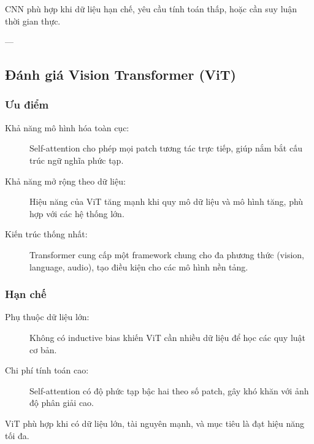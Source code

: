 \begin{mdframed}[style=infobox]
	CNN phù hợp khi dữ liệu hạn chế, yêu cầu tính toán thấp, hoặc cần suy luận thời gian thực.
\end{mdframed}

---

\subsection{Đánh giá Vision Transformer (ViT)}
\label{subsec:vit_evaluation}

\subsubsection{Ưu điểm}

\begin{description}
	\item[Khả năng mô hình hóa toàn cục:]  
	Self-attention cho phép mọi patch tương tác trực tiếp, giúp nắm bắt cấu trúc ngữ nghĩa phức tạp.
	
	\item[Khả năng mở rộng theo dữ liệu:]  
	Hiệu năng của ViT tăng mạnh khi quy mô dữ liệu và mô hình tăng, phù hợp với các hệ thống lớn.
	
	\item[Kiến trúc thống nhất:]  
	Transformer cung cấp một framework chung cho đa phương thức (vision, language, audio), tạo điều kiện cho các mô hình nền tảng.
\end{description}

\subsubsection{Hạn chế}

\begin{description}
	\item[Phụ thuộc dữ liệu lớn:]  
	Không có inductive bias khiến ViT cần nhiều dữ liệu để học các quy luật cơ bản.
	
	\item[Chi phí tính toán cao:]  
	Self-attention có độ phức tạp bậc hai theo số patch, gây khó khăn với ảnh độ phân giải cao.
\end{description}

\begin{mdframed}[style=infobox]
	ViT phù hợp khi có dữ liệu lớn, tài nguyên mạnh, và mục tiêu là đạt hiệu năng tối đa.
\end{mdframed}

